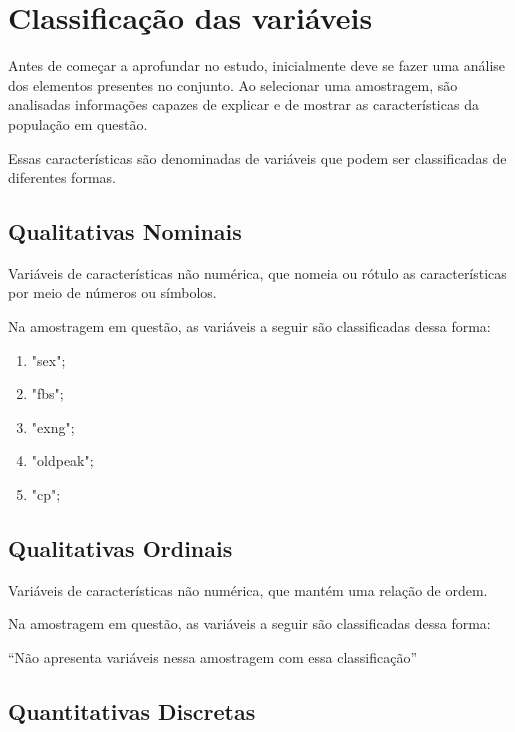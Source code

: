 \chapter{Classificação das variáveis}

    \setcounter{section}{0}

    Antes de começar a aprofundar no estudo, inicialmente deve se fazer uma análise dos elementos 
    presentes no conjunto. Ao selecionar uma amostragem, são analisadas informações capazes de explicar 
    e de mostrar as características da população em questão.

    Essas características são denominadas de variáveis que podem ser classificadas de diferentes formas.

    \section{Qualitativas Nominais}

    Variáveis de características não numérica, que nomeia ou rótulo as características por meio de números ou símbolos. 
    
    Na amostragem em questão, as variáveis a seguir são classificadas dessa forma: 

    \begin{enumerate}[label={\alph*)}]
        \addtolength{\itemindent}{1.25cm}
        \item "sex";
        \item "fbs";
        \item "exng";
        \item "oldpeak";
        \item "cp";
    \end{enumerate}

    \section{Qualitativas Ordinais}

    Variáveis de características não numérica, que mantém uma relação de ordem. 
  
    Na amostragem em questão, as variáveis a seguir são classificadas dessa forma: 

    
    “Não apresenta variáveis nessa amostragem com essa classificação”


    \section{Quantitativas Discretas}

